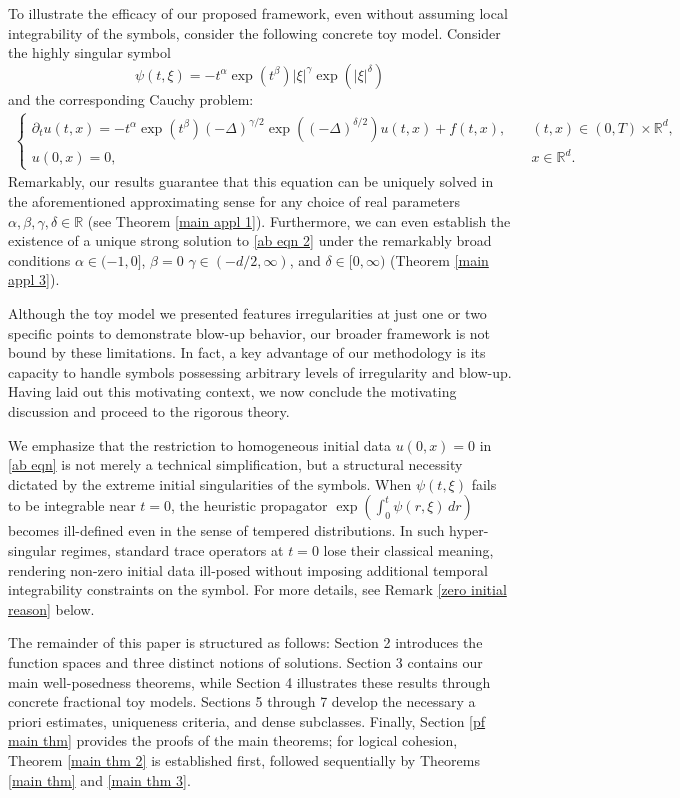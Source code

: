 \documentclass[11pt,reqno]{amsart}
\theoremstyle{definition}
\theoremstyle{remark}
\numberwithin{equation}{section}
\begin{document}
To illustrate the efficacy of our proposed framework, even without assuming local integrability of the symbols, consider the following concrete toy model.
Consider the highly singular symbol
$$
\psi(t,\xi)=-t^\alpha \exp\left( t^\beta \right) |\xi|^{\gamma} \exp\left( |\xi|^{\delta} \right) 
$$
and the corresponding Cauchy problem:
\begin{align}
									\label{ab eqn 2}
\begin{cases}
\partial_tu(t,x)= -t^\alpha \exp\left(  t^\beta \right) (-\Delta)^{\gamma/2} \exp\left( (-\Delta)^{\delta/2} \right)  u(t,x)+f(t,x),\quad &(t,x)\in(0,T)\times\mathbb{R}^d,\\
u(0,x)=0,\quad & x\in\mathbb{R}^d.
\end{cases}
\end{align}
Remarkably, our results guarantee that this equation can be uniquely solved in the aforementioned approximating sense for any choice of real parameters $\alpha,\beta,\gamma, \delta \in \mathbb{R}$ (see Theorem \ref{main appl 1}). 
Furthermore, we can even establish the existence of a unique strong solution to \eqref{ab eqn 2} under the remarkably broad conditions $\alpha \in (-1,0]$, $\beta=0$ $\gamma \in (-d/2,\infty)$, and $\delta \in [0,\infty)$ (Theorem \ref{main appl 3}).


Although the toy model we presented features irregularities at just one or two specific points to demonstrate blow-up behavior, our broader framework is not bound by these limitations. 
In fact, a key advantage of our methodology is its capacity to handle symbols possessing arbitrary levels of irregularity and blow-up. 
Having laid out this motivating context, we now conclude the motivating discussion and proceed to the rigorous theory.



We emphasize that the restriction to homogeneous initial data $u(0,x)=0$ in \eqref{ab eqn} is not merely a technical simplification, but a structural necessity dictated by the extreme initial singularities of the symbols. When $\psi(t,\xi)$ fails to be integrable near $t=0$, the heuristic propagator $\exp\left(\int_0^t \psi(r,\xi)\,dr\right)$ becomes ill-defined even in the sense of tempered distributions. In such hyper-singular regimes, standard trace operators at $t=0$ lose their classical meaning, rendering non-zero initial data ill-posed without imposing additional temporal integrability constraints on the symbol. For more details, see Remark \ref{zero initial reason} below.


The remainder of this paper is structured as follows: Section 2 introduces the function spaces and three distinct notions of solutions. Section 3 contains our main well-posedness theorems, while Section 4 illustrates these results through concrete fractional toy models. 
Sections 5 through 7 develop the necessary a priori estimates, uniqueness criteria, and dense subclasses. 
Finally, Section \ref{pf main thm} provides the proofs of the main theorems; for logical cohesion, Theorem \ref{main thm 2} is established first, followed sequentially by Theorems \ref{main thm} and \ref{main thm 3}.
\end{document}
